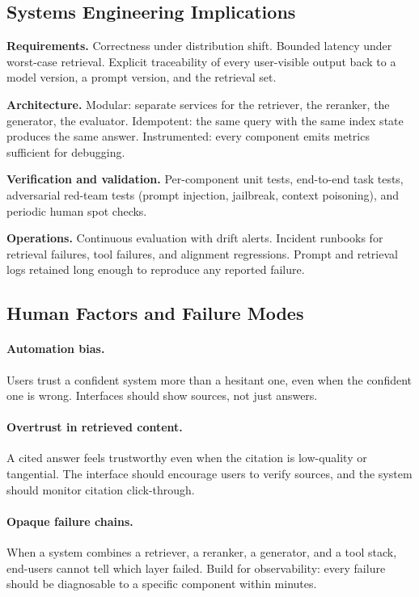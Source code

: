 \subsection{Systems Engineering Implications}

\textbf{Requirements.} Correctness under distribution shift.
Bounded latency under worst-case retrieval. Explicit traceability
of every user-visible output back to a model version, a prompt
version, and the retrieval set.

\textbf{Architecture.} Modular: separate services for the
retriever, the reranker, the generator, the evaluator.
Idempotent: the same query with the same index state produces
the same answer. Instrumented: every component emits metrics
sufficient for debugging.

\textbf{Verification and validation.} Per-component unit tests,
end-to-end task tests, adversarial red-team tests (prompt
injection, jailbreak, context poisoning), and periodic human
spot checks.

\textbf{Operations.} Continuous evaluation with drift alerts.
Incident runbooks for retrieval failures, tool failures, and
alignment regressions. Prompt and retrieval logs retained long
enough to reproduce any reported failure.

\subsection{Human Factors and Failure Modes}

\paragraph{Automation bias.} Users trust a confident system more
than a hesitant one, even when the confident one is wrong.
Interfaces should show sources, not just answers.

\paragraph{Overtrust in retrieved content.} A cited answer feels
trustworthy even when the citation is low-quality or tangential.
The interface should encourage users to verify sources, and the
system should monitor citation click-through.

\paragraph{Opaque failure chains.} When a system combines a
retriever, a reranker, a generator, and a tool stack, end-users
cannot tell which layer failed. Build for observability: every
failure should be diagnosable to a specific component within
minutes.

